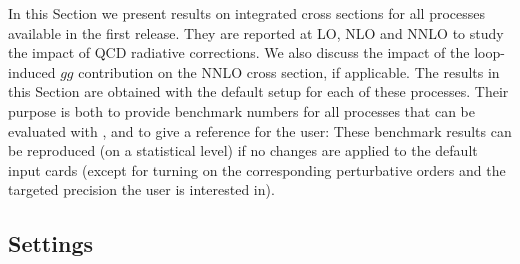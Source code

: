 \documentclass[english,11pt]{article}
\begin{document}
In this Section we present results on integrated cross sections for all processes available in the first \Matrix{} release.
They are reported at LO, NLO and NNLO to study the impact of QCD radiative corrections.
We also discuss the impact of the loop-induced $gg$ contribution on the NNLO cross section, if applicable. 
The results in this Section are obtained with the \Matrix{} default setup for each of these processes. 
Their purpose is both to provide benchmark numbers for all processes that can be evaluated with \Matrix{},
and to give a reference for the user:
These benchmark results can be reproduced (on a statistical level) if no changes are applied to the default input cards (except for turning on the 
corresponding perturbative orders and the targeted precision the user is interested in).

\subsection{Settings}\label{sec:settings}
\end{document}
